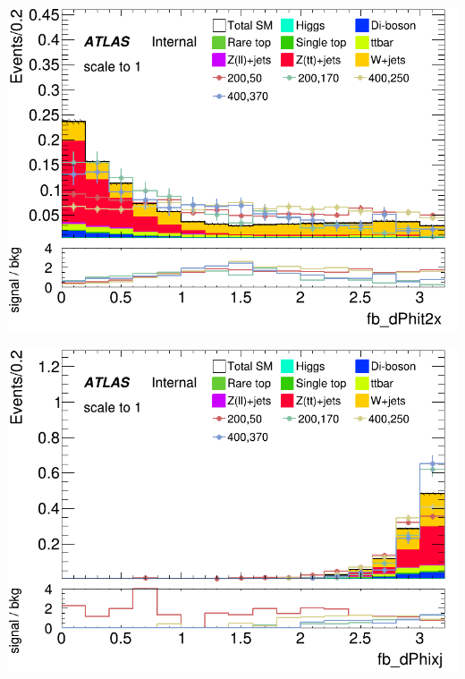 \documentclass[usenames,dvipsnames]{beamer}
\begin{document}
\begin{frame}
    \begin{minipage}{0.32\textwidth}
        \centering
        \includegraphics[width=\textwidth]{graphics/HH_met_sig/HH_fb_dPhit2x_norm.png}
    \end{minipage}
    \hfill
    \begin{minipage}{0.32\textwidth}
        \centering
        \includegraphics[width=\textwidth]{graphics/HH_met_sig/HH_fb_dPhixj_norm.png}
    \end{minipage}
    \hfill
    \begin{minipage}{0.32\textwidth}
        \centering

\end{minipage}
\end{frame}
\end{document}
